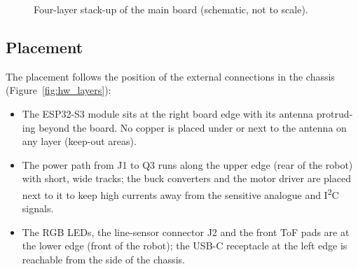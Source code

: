 \begin{otherlanguage}{english}
\begin{figure}[htbp]
  \centering
  \caption{Four-layer stack-up of the main board (schematic, not to scale).}
  \label{fig:hw_stackup}
\end{figure}

\subsection{Placement}
The placement follows the position of the external connections in the chassis
(Figure~\ref{fig:hw_layers}):
\begin{itemize}
  \item The ESP32-S3 module sits at the right board edge with its antenna protruding beyond the board.
        No copper is placed under or next to the antenna on any layer (keep-out areas).
  \item The power path from J1 to Q3 runs along the upper edge (rear of the robot) with short, wide tracks;
        the buck converters and the motor driver are placed next to it to keep high currents away from
        the sensitive analogue and I\textsuperscript{2}C signals.
  \item The RGB LEDs, the line-sensor connector J2 and the front ToF pads are at the lower edge
        (front of the robot); the USB-C receptacle at the left edge is reachable from the side of the chassis.
\end{itemize}


\end{otherlanguage}
